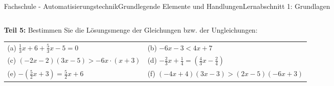 \documentclass[oneside,openany,headings=optiontotoc,11pt,numbers=noenddot]{scrreprt}
\begin{document}
\begin{worksheet}{Fachschule - Automatisierungstechnik}{Grundlegende Elemente und Handlungen}{Lernabschnitt 1: Grundlagen}
\begin{framed}
\begin{tabularx}{\textwidth}{XX}
			\end{tabularx}
		\end{framed}
		\begin{framed}
			\noindent
			\textbf{Teil 5:} Bestimmen Sie die Lösungsmenge der Gleichungen bzw. der Ungleichungen:\\
			\begin{tabularx}{\textwidth}{XX}
				(a) \(\frac{1}{3}x + 6 + \frac{5}{3}x -5 = 0\) & (b) \(-6x-3 < 4x+7\)\\
				(c) \((-2x-2)(3x-5) > -6x\cdot(x+3)\) &	(d) \(-\frac{2}{3}x + \frac{1}{4} = (\frac{4}{3}x - \frac{2}{4})\)\\
				(e) \(-(\frac{5}{2}x+3) = \frac{5}{2}x +6\) & (f) \((-4x+4)(3x - 3) > (2x-5)(-6x +3)\)
			\end{tabularx}
		\end{framed}
	\end{worksheet}
\end{document}
